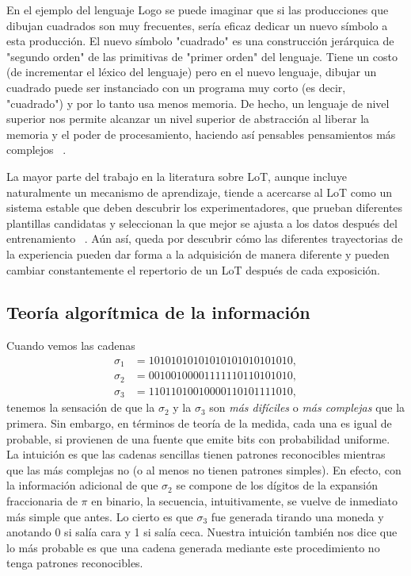 En el ejemplo del lenguaje Logo se puede imaginar que si las producciones que dibujan cuadrados son muy frecuentes, sería eficaz dedicar un nuevo símbolo a esta producción. El nuevo símbolo "cuadrado" es una construcción jerárquica de "segundo orden" de las primitivas de "primer orden" del lenguaje. Tiene un costo (de incrementar el léxico del lenguaje) pero en el nuevo lenguaje, dibujar un cuadrado puede ser instanciado con un programa muy corto (es decir, "cuadrado") y por lo tanto usa menos memoria. De hecho, un lenguaje de nivel superior nos permite alcanzar un nivel superior de abstracción al liberar la memoria y el poder de procesamiento, haciendo así pensables pensamientos más complejos ~\cite{minsky1967computation, murphy1988comprehending}.

La mayor parte del trabajo en la literatura sobre LoT, aunque incluye naturalmente un mecanismo de aprendizaje, tiende a acercarse al LoT como un sistema estable que deben descubrir los experimentadores, que prueban diferentes plantillas candidatas y seleccionan la que mejor se ajusta a los datos después del entrenamiento ~\cite{goodman2008rational, kemp2012exploring, piantadosi2016logical}. Aún así, queda por descubrir cómo las diferentes trayectorias de la experiencia pueden dar forma a la adquisición de manera diferente y pueden cambiar constantemente el repertorio de un LoT después de cada exposición.


\subsection{Teoría algorítmica de la información}


Cuando vemos las cadenas 
\begin{align*}
\sigma_1 &= 10101010101010101010101010,\\
\sigma_2 &= 00100100001111110110101010, \\
\sigma_3 &= 11011010010000110101111010,
\end{align*}
tenemos la sensación de que la $\sigma_2$ y la $\sigma_3$
son {\em más difíciles} o {\em más complejas} que la primera. Sin embargo, en términos de
teoría de la medida, cada una es igual de probable, si provienen de una fuente que emite bits 
con probabilidad uniforme. 
La intuición es que las cadenas sencillas tienen patrones reconocibles mientras
que las más complejas no (o al menos no tienen patrones simples). 
En efecto, con la información adicional de que $\sigma_2$ se compone de los dígitos de 
la expansión fraccionaria de $\pi$ en binario, la secuencia, intuitivamente, se vuelve de inmediato más simple que antes. Lo cierto es que $\sigma_3$ fue generada tirando una moneda y anotando 0 si salía cara y 1 si salía ceca. Nuestra intuición también nos dice que lo más probable es que una cadena generada mediante este procedimiento no tenga patrones reconocibles.

